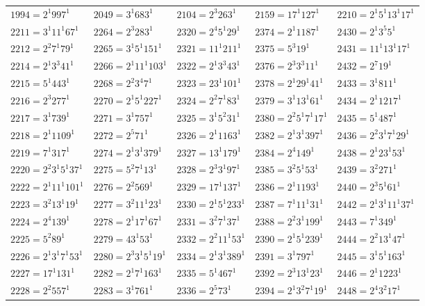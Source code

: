 {\begin{longtable}[c]{*{5}{l}}
$1994=2^{1}997^{1}$&$2049=3^{1}683^{1}$&$2104=2^{3}263^{1}$&$2159=17^{1}127^{1}$&$2210=2^{1}5^{1}13^{1}17^{1}$\\
\pagebreak
$2211=3^{1}11^{1}67^{1}$&$2264=2^{3}283^{1}$&$2320=2^{4}5^{1}29^{1}$&$2374=2^{1}1187^{1}$&$2430=2^{1}3^{5}5^{1}$\\
$2212=2^{2}7^{1}79^{1}$&$2265=3^{1}5^{1}151^{1}$&$2321=11^{1}211^{1}$&$2375=5^{3}19^{1}$&$2431=11^{1}13^{1}17^{1}$\\
$2214=2^{1}3^{3}41^{1}$&$2266=2^{1}11^{1}103^{1}$&$2322=2^{1}3^{3}43^{1}$&$2376=2^{3}3^{3}11^{1}$&$2432=2^{7}19^{1}$\\
$2215=5^{1}443^{1}$&$2268=2^{2}3^{4}7^{1}$&$2323=23^{1}101^{1}$&$2378=2^{1}29^{1}41^{1}$&$2433=3^{1}811^{1}$\\
$2216=2^{3}277^{1}$&$2270=2^{1}5^{1}227^{1}$&$2324=2^{2}7^{1}83^{1}$&$2379=3^{1}13^{1}61^{1}$&$2434=2^{1}1217^{1}$\\
$2217=3^{1}739^{1}$&$2271=3^{1}757^{1}$&$2325=3^{1}5^{2}31^{1}$&$2380=2^{2}5^{1}7^{1}17^{1}$&$2435=5^{1}487^{1}$\\
$2218=2^{1}1109^{1}$&$2272=2^{5}71^{1}$&$2326=2^{1}1163^{1}$&$2382=2^{1}3^{1}397^{1}$&$2436=2^{2}3^{1}7^{1}29^{1}$\\
$2219=7^{1}317^{1}$&$2274=2^{1}3^{1}379^{1}$&$2327=13^{1}179^{1}$&$2384=2^{4}149^{1}$&$2438=2^{1}23^{1}53^{1}$\\
$2220=2^{2}3^{1}5^{1}37^{1}$&$2275=5^{2}7^{1}13^{1}$&$2328=2^{3}3^{1}97^{1}$&$2385=3^{2}5^{1}53^{1}$&$2439=3^{2}271^{1}$\\
$2222=2^{1}11^{1}101^{1}$&$2276=2^{2}569^{1}$&$2329=17^{1}137^{1}$&$2386=2^{1}1193^{1}$&$2440=2^{3}5^{1}61^{1}$\\
$2223=3^{2}13^{1}19^{1}$&$2277=3^{2}11^{1}23^{1}$&$2330=2^{1}5^{1}233^{1}$&$2387=7^{1}11^{1}31^{1}$&$2442=2^{1}3^{1}11^{1}37^{1}$\\
$2224=2^{4}139^{1}$&$2278=2^{1}17^{1}67^{1}$&$2331=3^{2}7^{1}37^{1}$&$2388=2^{2}3^{1}199^{1}$&$2443=7^{1}349^{1}$\\
$2225=5^{2}89^{1}$&$2279=43^{1}53^{1}$&$2332=2^{2}11^{1}53^{1}$&$2390=2^{1}5^{1}239^{1}$&$2444=2^{2}13^{1}47^{1}$\\
$2226=2^{1}3^{1}7^{1}53^{1}$&$2280=2^{3}3^{1}5^{1}19^{1}$&$2334=2^{1}3^{1}389^{1}$&$2391=3^{1}797^{1}$&$2445=3^{1}5^{1}163^{1}$\\
$2227=17^{1}131^{1}$&$2282=2^{1}7^{1}163^{1}$&$2335=5^{1}467^{1}$&$2392=2^{3}13^{1}23^{1}$&$2446=2^{1}1223^{1}$\\
$2228=2^{2}557^{1}$&$2283=3^{1}761^{1}$&$2336=2^{5}73^{1}$&$2394=2^{1}3^{2}7^{1}19^{1}$&$2448=2^{4}3^{2}17^{1}$\\

\end{longtable}}
